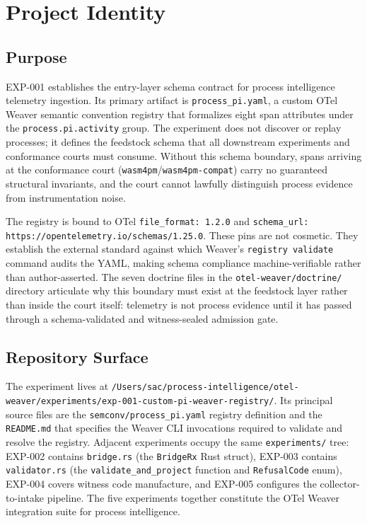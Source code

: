 
\section{Project Identity}
\label{sec:otel-weaver-exp-001-custom-pi-registry-identity}

\subsection{Purpose}
\label{sec:otel-weaver-exp-001-custom-pi-registry-identity-purpose}

EXP-001 establishes the entry-layer schema contract for process intelligence telemetry ingestion.
Its primary artifact is \texttt{process\_pi.yaml}, a custom OTel Weaver semantic convention
registry that formalizes eight span attributes under the \texttt{process.pi.activity} group.
The experiment does not discover or replay processes; it defines the feedstock schema that all
downstream experiments and conformance courts must consume. Without this schema boundary, spans
arriving at the conformance court (\texttt{wasm4pm}/\texttt{wasm4pm-compat}) carry no guaranteed
structural invariants, and the court cannot lawfully distinguish process evidence from
instrumentation noise.

The registry is bound to OTel \texttt{file\_format: 1.2.0} and
\texttt{schema\_url: https://opentelemetry.io/schemas/1.25.0}.
These pins are not cosmetic. They establish the external standard against which Weaver's
\texttt{registry validate} command audits the YAML, making schema compliance machine-verifiable
rather than author-asserted. The seven doctrine files in the \texttt{otel-weaver/doctrine/}
directory articulate why this boundary must exist at the feedstock layer rather than inside the
court itself: telemetry is not process evidence until it has passed through a schema-validated and
witness-sealed admission gate.

\subsection{Repository Surface}
\label{sec:otel-weaver-exp-001-custom-pi-registry-identity-surface}

The experiment lives at
\texttt{/Users/sac/process-intelligence/otel-weaver/experiments/exp-001-custom-pi-weaver-registry/}.
Its principal source files are the \texttt{semconv/process\_pi.yaml} registry definition and the
\texttt{README.md} that specifies the Weaver CLI invocations required to validate and resolve the
registry. Adjacent experiments occupy the same \texttt{experiments/} tree: EXP-002 contains
\texttt{bridge.rs} (the \texttt{BridgeRx} Rust struct), EXP-003 contains \texttt{validator.rs}
(the \texttt{validate\_and\_project} function and \texttt{RefusalCode} enum), EXP-004 covers
witness code manufacture, and EXP-005 configures the collector-to-intake pipeline. The five
experiments together constitute the OTel Weaver integration suite for process intelligence.

